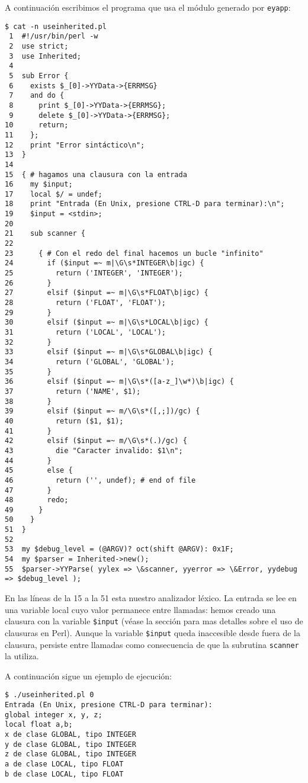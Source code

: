 A continuación escribimos el programa que usa 
el módulo generado por \verb|eyapp|:

\begin{verbatim}
$ cat -n useinherited.pl
 1  #!/usr/bin/perl -w
 2  use strict;
 3  use Inherited;
 4
 5  sub Error {
 6    exists $_[0]->YYData->{ERRMSG}
 7    and do {
 8      print $_[0]->YYData->{ERRMSG};
 9      delete $_[0]->YYData->{ERRMSG};
10      return;
11    };
12    print "Error sintáctico\n";
13  }
14
15  { # hagamos una clausura con la entrada
16    my $input;
17    local $/ = undef;
18    print "Entrada (En Unix, presione CTRL-D para terminar):\n";
19    $input = <stdin>;
20
21    sub scanner {
22
23      { # Con el redo del final hacemos un bucle "infinito"
24        if ($input =~ m|\G\s*INTEGER\b|igc) {
25          return ('INTEGER', 'INTEGER');
26        }
27        elsif ($input =~ m|\G\s*FLOAT\b|igc) {
28          return ('FLOAT', 'FLOAT');
29        }
30        elsif ($input =~ m|\G\s*LOCAL\b|igc) {
31          return ('LOCAL', 'LOCAL');
32        }
33        elsif ($input =~ m|\G\s*GLOBAL\b|igc) {
34          return ('GLOBAL', 'GLOBAL');
35        }
36        elsif ($input =~ m|\G\s*([a-z_]\w*)\b|igc) {
37          return ('NAME', $1);
38        }
39        elsif ($input =~ m/\G\s*([,;])/gc) {
40          return ($1, $1);
41        }
42        elsif ($input =~ m/\G\s*(.)/gc) {
43          die "Caracter invalido: $1\n";
44        }
45        else {
46          return ('', undef); # end of file
47        }
48        redo;
49      }
50    }
51  }
52
53  my $debug_level = (@ARGV)? oct(shift @ARGV): 0x1F;
54  my $parser = Inherited->new();
55  $parser->YYParse( yylex => \&scanner, yyerror => \&Error, yydebug => $debug_level );
\end{verbatim}
En las líneas de la 15 a la 51 esta nuestro analizador léxico.
La entrada se lee en una variable local cuyo valor permanece
entre llamadas: hemos creado una clausura con la variable
\verb|$input| (véase la sección  para mas detalles
sobre el uso de clausuras en Perl). Aunque la variable \verb|$input|
queda inaccesible desde fuera de la clausura, persiste entre llamadas
como consecuencia de que la subrutina \verb|scanner| la utiliza.

A continuación sigue un ejemplo de ejecución:

\begin{verbatim}
$ ./useinherited.pl 0
Entrada (En Unix, presione CTRL-D para terminar):
global integer x, y, z;
local float a,b;
x de clase GLOBAL, tipo INTEGER
y de clase GLOBAL, tipo INTEGER
z de clase GLOBAL, tipo INTEGER
a de clase LOCAL, tipo FLOAT
b de clase LOCAL, tipo FLOAT
\end{verbatim}

